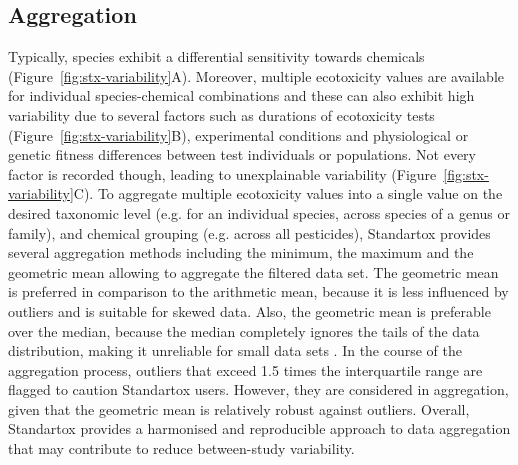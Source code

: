 \documentclass[journal,datadescriptor,accept,moreauthors,pdftex]{Definitions/mdpi}
\begin{document}
\subsection{Aggregation}
Typically, species exhibit a differential sensitivity towards chemicals (Figure~\ref{fig:stx-variability}A). Moreover, multiple ecotoxicity values are available for individual species-chemical combinations and these can also exhibit high variability due to several factors such as durations of ecotoxicity tests (Figure~\ref{fig:stx-variability}B), experimental conditions and physiological or genetic fitness differences between test individuals or populations. Not every factor is recorded though, leading to unexplainable variability (Figure~\ref{fig:stx-variability}C). To aggregate multiple ecotoxicity values into a single value on the desired taxonomic level (e.g. for an individual species, across species of a genus or family), and chemical grouping (e.g. across all pesticides), Standartox provides several aggregation methods including the minimum, the maximum and the geometric mean allowing to aggregate the filtered data set. The geometric mean is preferred in comparison to the arithmetic mean, because it is less influenced by outliers and is suitable for skewed data. Also, the geometric mean is preferable over the median, because the median completely ignores the tails of the data distribution, making it unreliable for small data sets \citep{leith_comparison_2010}. In the course of the aggregation process, outliers that exceed 1.5 times the interquartile range are flagged to caution Standartox users. However, they are considered in aggregation, given that the geometric mean is relatively robust against outliers. Overall, Standartox provides a harmonised and reproducible approach to data aggregation that may contribute to reduce between-study variability.
\end{document}
